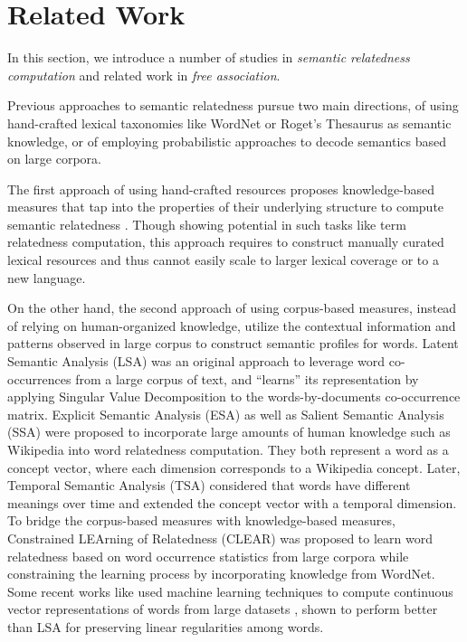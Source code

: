 \section{Related Work}
\label{sec:related}

In this section, we introduce a number of studies
in {\em semantic relatedness computation}
and related work in {\em free association}.

Previous approaches to semantic relatedness pursue two main
directions, of using hand-crafted lexical taxonomies like
WordNet \cite{Miller1995} or Roget's Thesaurus \cite{Roget} as
semantic knowledge, or of employing probabilistic approaches to
decode semantics based on large corpora.

The first approach of using hand-crafted resources proposes
knowledge-based measures that tap into the properties of their underlying
structure to compute semantic relatedness
 \cite{Roget,Lin:1998,leacock1998,Hirst:1998,Jiang:1997,Resnik:1995,wu1994verbs}.
Though showing potential in such tasks like term relatedness
computation, this approach requires to construct manually curated lexical
resources and thus cannot easily scale to larger lexical coverage or
to a new language.

On the other hand, the second approach of using corpus-based
measures, instead of relying on human-organized knowledge, utilize
the contextual information and patterns observed in large corpus to
construct semantic profiles for words. Latent Semantic Analysis
(LSA) \cite{LSA} was an original approach to leverage word
co-occurrences from a large corpus of text, and ``learns''
its representation by applying Singular Value Decomposition to
the words-by-documents co-occurrence matrix. Explicit Semantic Analysis
(ESA) \cite{ESA} as well as Salient Semantic Analysis (SSA) \cite{SSA}
were proposed to incorporate large amounts of human
knowledge such as Wikipedia into word
relatedness computation. They both represent a word as a concept
vector, where each dimension corresponds to a Wikipedia concept.
Later, Temporal Semantic Analysis (TSA) \cite{TSA} considered that
words have different meanings over time and extended the concept
vector with a temporal dimension.
To bridge the corpus-based measures with
knowledge-based measures, Constrained LEArning of Relatedness (CLEAR) \cite{CLEAR}
was proposed to learn word
relatedness based on word occurrence statistics from large corpora
while constraining the learning process by incorporating knowledge
from WordNet.  Some recent works like \cite{mikolov} used machine learning techniques
to compute continuous vector representations of words from large datasets
, shown to perform better than LSA for preserving linear regularities among words.

